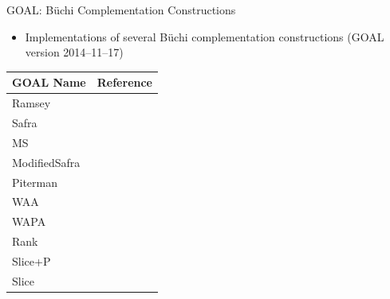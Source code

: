 \documentclass[12pt,handout]{beamer}
\begin{document}
\begin{frame}{GOAL: Büchi Complementation Constructions}
\begin{itemize}
\item Implementations of several Büchi complementation constructions (GOAL version 2014--11--17)
\end{itemize}
\centering
\footnotesize
\begin{tabular}{ll}
\hline
GOAL Name & Reference \\
\hline
Ramsey        & \cite{1985_sistla,PrasadSistla1987217} \\
Safra         & \cite{1988_safra_2,1988_safra_1} \\
MS            & \cite{Muller199569} \\
ModifiedSafra & \cite{2006_althoff} \\
Piterman      & \cite{2006_piterman,2007_piterman} \\
WAA           & \cite{1997_vardi,Kupferman:2001} \\
WAPA          & \cite{1999_thomas} \\
Rank          & \cite{schewe2009buchi} \\
Slice+P       & \cite{vardi2007automata} \\
Slice         & \cite{2008_kaehler} \\
\hline
\end{tabular}
\end{frame}
\end{document}
